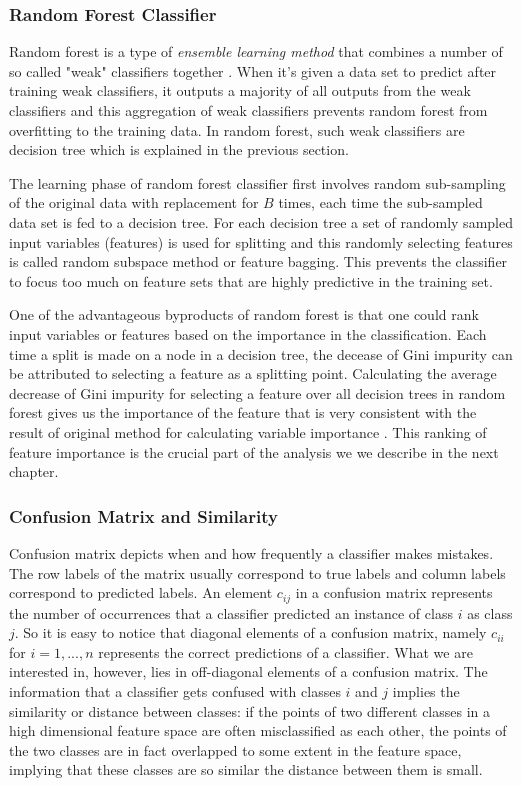 \documentclass{article}
\begin{document}
	
		\subsubsection{Random Forest Classifier}
Random forest is a type of \textit{ensemble learning method} that combines a number of so called "weak" classifiers together \cite{RandomForest}. When it's given a data set to predict after training weak classifiers, it outputs a majority of all outputs from the weak classifiers and this aggregation of weak classifiers prevents random forest from overfitting to the training data. In random forest, such weak classifiers are decision tree which is explained in the previous section.

The learning phase of random forest classifier first involves random sub-sampling of the original data with replacement for $B$ times, each time the sub-sampled data set is fed to a decision tree. For each decision tree a set of randomly sampled input variables (features) is used for splitting and this randomly selecting features is called random subspace method or feature bagging. This prevents the classifier to focus too much on feature sets that are highly predictive in the training set. 

One of the advantageous byproducts of random forest is that one could rank input variables or features based on the importance in the classification. Each time a split is made on a node in a decision tree, the decease of Gini impurity can be attributed to selecting a feature as a splitting point.  Calculating the average decrease of Gini impurity for selecting a feature over all decision trees in random forest gives us the importance of the feature that is very consistent with the result of original method for calculating variable importance \cite{RandomForest,RandomForestOnline}. This ranking of feature importance is the crucial part of the analysis we we describe in the next chapter.


		\subsubsection{Confusion Matrix and Similarity}
	Confusion matrix depicts when and how frequently a classifier makes mistakes. The row labels of the matrix usually correspond to  true labels and column labels correspond to predicted labels. An element $c_{ij}$ in a confusion matrix represents the number of occurrences that a classifier predicted an instance of class $i$ as class $j$. So it is easy to notice that diagonal elements of a confusion matrix, namely $c_{ii}$ for $i = 1,...,n$ represents the correct predictions of a classifier. What we are interested in, however, lies in off-diagonal elements of a confusion matrix. The information that a classifier gets confused with classes $i$ and $j$ implies the similarity or distance between classes: if the points of two different classes in a high dimensional feature space are often misclassified as each other,  
the points of the two classes are in fact overlapped to some extent in the feature space, implying that these classes are so similar the distance between them is small.
\end{document}
